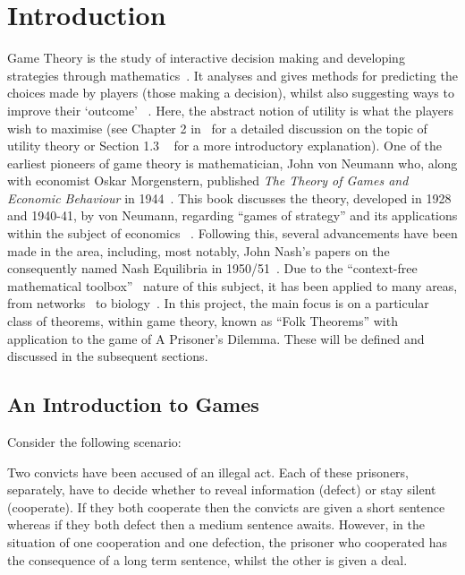 \chapter{Introduction}\label{ch:Introduction}

Game Theory is the study of interactive decision making and developing
strategies through mathematics~\cite{Dictionary2013}. It analyses and gives
methods for predicting the choices made by players (those making a decision),
whilst also suggesting ways to improve their `outcome'
~\cite{maschler_solan_zamir_2013}. Here, the abstract notion of utility is what
the players wish to maximise (see Chapter 2 in~\cite{maschler_solan_zamir_2013}
for a detailed discussion on the topic of utility theory or Section 1.3
~\cite{Webb2007} for a more introductory explanation). One of the earliest
pioneers of game theory is mathematician, John von Neumann who, along with
economist Oskar Morgenstern, published \textit{The Theory of Games and Economic
Behaviour} in 1944~\cite{maschler_solan_zamir_2013}. This book discusses the
theory, developed in 1928 and 1940-41, by von Neumann, regarding ``games of
strategy'' and its applications within the subject of economics
~\cite{von2007theory}. Following this, several advancements have been made in
the area, including, most notably, John Nash's papers on the consequently named
Nash Equilibria in 1950/51~\cite{nash1950equilibrium, nash1951non}. Due to the
``context-free mathematical toolbox''~\cite{maschler_solan_zamir_2013} nature of
this subject, it has been applied to many areas, from
networks~\cite{liang2012game, 1593279} to biology~\cite{chen2009robust, 
adeoye2012application}. In this project, the main focus is on a
particular class of theorems, within game theory, known as ``Folk Theorems'' with
application to the game of A Prisoner's Dilemma. These will be defined and
discussed in the subsequent sections.

\section{An Introduction to Games}\label{sec:An_Intro_to_Games}
Consider the following scenario:

\begin{center}
    Two convicts have been accused of an illegal act. Each of these prisoners,
    separately, have to decide whether to reveal information (defect) or stay
    silent (cooperate). If they both cooperate then the convicts are given a
    short sentence whereas if they both defect then a medium sentence awaits.
    However, in the situation of one cooperation and one defection, the prisoner
    who cooperated has the consequence of a long term sentence, whilst the other
    is given a deal.~\cite{Knight2017}
\end{center}


